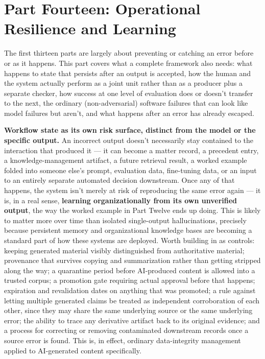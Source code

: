 \section{Part Fourteen: Operational Resilience and Learning}

The first thirteen parts are largely about preventing or catching an error before or as it happens. This part covers what a complete framework also needs: what happens to state that persists after an output is accepted, how the human and the system actually perform as a joint unit rather than as a producer plus a separate checker, how success at one level of evaluation does or doesn't transfer to the next, the ordinary (non-adversarial) software failures that can look like model failures but aren't, and what happens after an error has already escaped.

\textbf{Workflow state as its own risk surface, distinct from the model or the specific output.} An incorrect output doesn't necessarily stay contained to the interaction that produced it --- it can become a matter record, a precedent entry, a knowledge-management artifact, a future retrieval result, a worked example folded into someone else's prompt, evaluation data, fine-tuning data, or an input to an entirely separate automated decision downstream. Once any of that happens, the system isn't merely at risk of reproducing the same error again --- it is, in a real sense, \textbf{learning organizationally from its own unverified output}, the way the worked example in Part Twelve ends up doing. This is likely to matter more over time than isolated single-output hallucinations, precisely because persistent memory and organizational knowledge bases are becoming a standard part of how these systems are deployed. Worth building in as controls: keeping generated material visibly distinguished from authoritative material; provenance that survives copying and summarization rather than getting stripped along the way; a quarantine period before AI-produced content is allowed into a trusted corpus; a promotion gate requiring actual approval before that happens; expiration and revalidation dates on anything that was promoted; a rule against letting multiple generated claims be treated as independent corroboration of each other, since they may share the same underlying source or the same underlying error; the ability to trace any derivative artifact back to its original evidence; and a process for correcting or removing contaminated downstream records once a source error is found. This is, in effect, ordinary data-integrity management applied to AI-generated content specifically.

